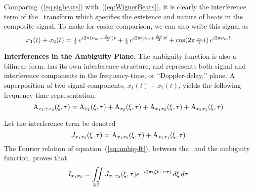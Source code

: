 Comparing~(\ref{eq:sigbeats}) with~(\ref{eq:WignerBeats}), it is
clearly the interference term of the \WV\ transform which specifies
the existence and nature of beats in the composite signal.
To make for easier comparison, we can also write this signal as
\[
  x_1(t)+x_2(t) 
    = {\scriptstyle \frac{1}{2}} \,e^{i2\pi(\nu_m-{\scriptstyle \frac{\Delta\nu}{2}})t} 
      + {\scriptstyle \frac{1}{2}} \,e^{i2\pi(\nu_m+{\scriptstyle \frac{\Delta\nu}{2}})t}
      + \cos(2\pi{\scriptstyle \frac{\Delta\nu}{2}} t)\,e^{i2\pi\nu_m t}
\]
\begin{define}{\bf Interferences in the Ambiguity Plane. }
The ambiguity function is also a bilinear form, has its own
interference structure, and represents both signal and interference
components in the frequency-time, or ``Doppler-delay,'' plane.
A superposition of two signal components, 
$x_1(t) + x_2(t)$, 
yields the following frequency-time representation:
\[
  \operatorname{A}_{x_1+x_2}(\xi,\tau) 
    = \operatorname{A}_{x_1}(\xi,\tau)+\operatorname{A}_{x_2}(\xi,\tau)
      + \operatorname{A}_{x_1x_2}(\xi,\tau) + \operatorname{A}_{x_2x_1}(\xi,\tau) 
\]
\end{define}
Let the interference term be denoted
\[
 J_{x_1x_2}(\xi,\tau) = \operatorname{A}_{x_1x_2}(\xi,\tau) + \operatorname{A}_{x_2x_1}(\xi,\tau) 
\]
The Fourier relation of equation~(\ref{eq:ambig-ft}), between the \WV\
and the ambiguity function, proves that 
\[
 I_{x_1x_2} = \iint\limits_{\mathbb{R}^2} J_{x_1x_2}(\xi,\tau) 
              e^{-i2\pi(\xi t + \nu\tau)}\,d\xi\,d\tau
\]

